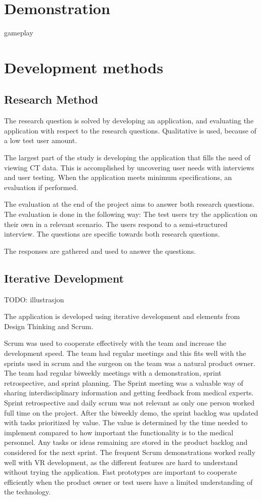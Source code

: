 \documentclass[a4paper]{report}
\begin{document}
\section{Demonstration}\label{demonstration}
gameplay

\section{Development methods}

\subsection{Research Method}
The research question is solved by developing an application, and evaluating the application with respect to the research questions. Qualitative is used, because of a low test user amount.

The largest part of the study is developing the application that fills the need of viewing CT data. This is accomplished by uncovering user needs with interviews and user testing. When the application meets minimum specifications, an evaluation if performed. 

The evaluation at the end of the project aims to answer both research questions. The evaluation is done in the following way:
The test users try the application on their own in a relevant scenario.
The users respond to a semi-structured interview. The questions are specific towards both research questions.

The responses are gathered and used to answer the questions.

\subsection{Iterative Development}
TODO: illustrasjon

The application is developed using iterative development and elements from Design Thinking and Scrum.

Scrum was used to cooperate effectively with the team and increase the development speed. The team had regular meetings and this fits well with the sprints used in scrum and the surgeon on the team was a natural product owner.
The team had regular biweekly meetings with a demonstration, sprint retrospective, and sprint planning. The Sprint meeting was a valuable way of sharing interdisciplinary information and getting feedback from medical experts. Sprint retrospective and daily scrum was not relevant as only one person worked full time on the project.
After the biweekly demo, the sprint backlog was updated with tasks prioritized by value. The value is determined by the time needed to implement compared to how important the functionality is to the medical personnel. Any tasks or ideas remaining are stored in the product backlog and considered for the next sprint.
The frequent Scrum demonstrations worked really well with VR development, as the different features are hard to understand without trying the application. Fast prototypes are important to cooperate efficiently when the product owner or test users have a limited understanding of the technology.
\end{document}

